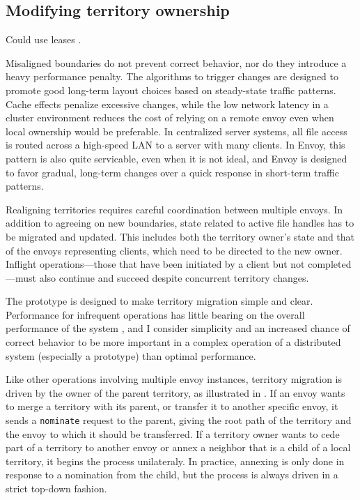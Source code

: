 \subsection{Modifying territory ownership}

Could use leases \cite{gray89}.

Misaligned boundaries do not prevent correct behavior, nor do they introduce a heavy performance penalty. The algorithms to trigger changes are designed to promote good long-term layout choices based on steady-state traffic patterns. Cache effects penalize excessive changes, while the low network latency in a cluster environment reduces the cost of relying on a remote envoy even when local ownership would be preferable. In centralized server systems, all file access is routed across a high-speed LAN to a server with many clients. In Envoy, this pattern is also quite servicable, even when it is not ideal, and Envoy is designed to favor gradual, long-term changes over a quick response in short-term traffic patterns.

Realigning territories requires careful coordination between multiple envoys. In addition to agreeing on new boundaries, state related to active file handles has to be migrated and updated. This includes both the territory owner's state and that of the envoys representing clients, which need to be directed to the new owner. Inflight operations---those that have been initiated by a client but not completed---must also continue and succeed despite concurrent territory changes.

The prototype is designed to make territory migration simple and clear. Performance for infrequent operations has little bearing on the overall performance of the system \cite{amdahl}, and I consider simplicity and an increased chance of correct behavior to be more important in a complex operation of a distributed system (especially a prototype) than optimal performance.

Like other operations involving multiple envoy instances, territory migration is driven by the owner of the parent territory, as illustrated in . If an envoy wants to merge a territory with its parent, or transfer it to another specific envoy, it sends a \texttt{nominate} request to the parent, giving the root path of the territory and the envoy to which it should be transferred. If a territory owner wants to cede part of a territory to another envoy or annex a neighbor that is a child of a local territory, it begins the process unilateraly. In practice, annexing is only done in response to a nomination from the child, but the process is always driven in a strict top-down fashion.

